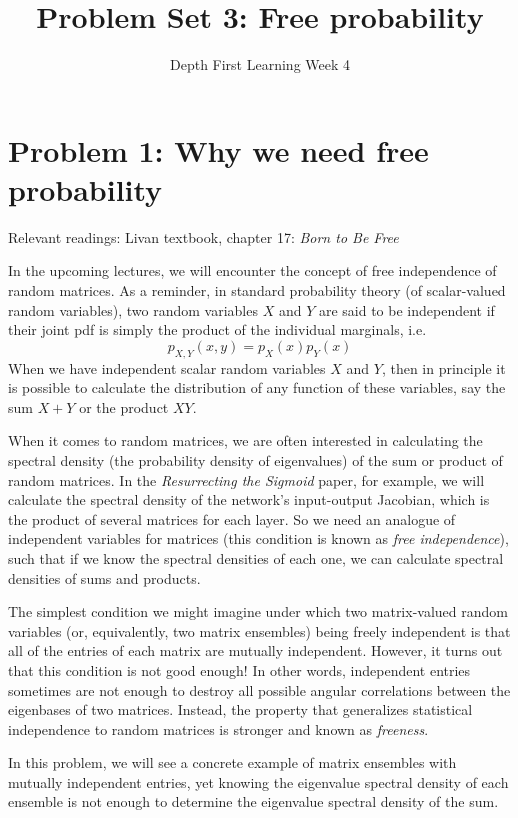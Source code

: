 \documentclass[a4paper]{article}
\title{Problem Set 3: Free probability}
\date{Depth First Learning Week 4}
\begin{document}
\maketitle


\section*{Problem 1: Why we need free probability}

Relevant readings: Livan textbook, chapter 17: \emph{Born to Be Free}

In the upcoming lectures, we will encounter the concept of free independence of random matrices.  As a reminder, in standard probability theory (of scalar-valued random variables), two random variables $X$ and $Y$ are said to be independent if their joint pdf is simply the product of the individual marginals, i.e.
\begin{equation}
    p_{X,Y}(x,y) = p_X(x) p_Y(x)
\end{equation}
When we have independent scalar random variables $X$ and $Y$, then in principle it is possible to calculate the distribution of any function of these variables, say the sum $X + Y$ or the product $XY$. 

When it comes to random matrices, we are often interested in calculating the spectral density (the probability density of eigenvalues) of the sum or product of random matrices.  In the \emph{Resurrecting the Sigmoid} paper, for example, we will calculate the spectral density of the network's input-output Jacobian, which is the product of several matrices for each layer.  So we need an analogue of independent variables for matrices (this condition is known as \emph{free independence}), such that if we know the spectral densities of each one, we can calculate spectral densities of sums and products.

The simplest condition we might imagine under which two matrix-valued random variables (or, equivalently, two matrix ensembles) being freely independent is that all of the entries of each matrix are mutually independent.  However, it turns out that this condition is not good enough! In other words, independent entries sometimes are not enough to destroy all possible angular correlations between the eigenbases of two matrices. Instead, the property that generalizes statistical independence to random matrices is stronger and known as \textit{freeness}.

 In this problem, we will see a concrete example of matrix ensembles with mutually independent entries, yet knowing the eigenvalue spectral density of each ensemble is not enough to determine the eigenvalue spectral density of the sum. 
\end{document}
